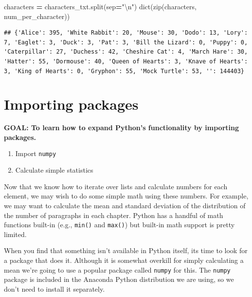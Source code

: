 \documentclass[
]{book}
\newenvironment{Shaded}{\begin{snugshade}}{\end{snugshade}}
\newcommand{\BuiltInTok}[1]{#1}
\newcommand{\CharTok}[1]{\textcolor[rgb]{0.31,0.60,0.02}{#1}}
\newcommand{\NormalTok}[1]{#1}
\newcommand{\OperatorTok}[1]{\textcolor[rgb]{0.81,0.36,0.00}{\textbf{#1}}}
\newcommand{\StringTok}[1]{\textcolor[rgb]{0.31,0.60,0.02}{#1}}
\providecommand{\tightlist}{%
  \setlength{\itemsep}{0pt}\setlength{\parskip}{0pt}}
\begin{document}
\begin{Shaded}
\begin{Highlighting}[]
\NormalTok{characters }\OperatorTok{=}\NormalTok{ characters\_txt.split(sep}\OperatorTok{=}\StringTok{"}\CharTok{\textbackslash{}n}\StringTok{"}\NormalTok{)}
\BuiltInTok{dict}\NormalTok{(}\BuiltInTok{zip}\NormalTok{(characters, num\_per\_character))}
\end{Highlighting}
\end{Shaded}

\begin{verbatim}
## {'Alice': 395, 'White Rabbit': 20, 'Mouse': 30, 'Dodo': 13, 'Lory': 7, 'Eaglet': 3, 'Duck': 3, 'Pat': 3, 'Bill the Lizard': 0, 'Puppy': 0, 'Caterpillar': 27, 'Duchess': 42, 'Cheshire Cat': 4, 'March Hare': 30, 'Hatter': 55, 'Dormouse': 40, 'Queen of Hearts': 3, 'Knave of Hearts': 3, 'King of Hearts': 0, 'Gryphon': 55, 'Mock Turtle': 53, '': 144403}
\end{verbatim}

\hypertarget{importing-packages}{%
\section{Importing packages}\label{importing-packages}}

\textbf{GOAL: To learn how to expand Python's functionality by importing packages.}

\begin{enumerate}
\def\labelenumi{\arabic{enumi}.}
\tightlist
\item
  Import \texttt{numpy}
\item
  Calculate simple statistics
\end{enumerate}

Now that we know how to iterate over lists and calculate numbers for each element, we may wish to do some simple math using these numbers. For example, we may want to calculate the mean and standard deviation of the distribution of the number of paragraphs in each chapter. Python has a handful of math functions built-in (e.g., \texttt{min()} and \texttt{max()}) but built-in math support is pretty limited.

When you find that something isn't available in Python itself, its time to look for a package that does it. Although it is somewhat overkill for simply calculating a mean we're going to use a popular package called \texttt{numpy} for this. The \texttt{numpy} package is included in the Anaconda Python distribution we are using, so we don't need to install it separately.
\end{document}
